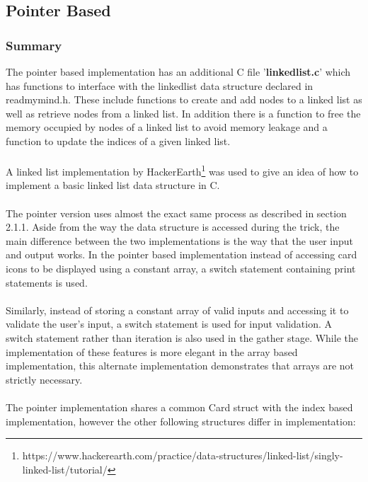 \documentclass[11]{article}
\begin{document}
		\subsection{Pointer Based}
			\subsubsection{Summary}
			The pointer based implementation has an additional C file '\textbf{linkedlist.c}' which has functions to interface with the linkedlist data structure declared in readmymind.h. These include functions to create and add nodes to a linked list as well as retrieve nodes from a linked list. In addition there is a function to free the memory occupied by nodes of a linked list to avoid memory leakage and a function to update the indices of a given linked list. \\\\A linked list implementation by HackerEarth\footnote{https://www.hackerearth.com/practice/data-structures/linked-list/singly-linked-list/tutorial/} was used to give an idea of how to implement a basic linked list data structure in C. \\\\ The pointer version uses almost the exact same process as described in section 2.1.1. Aside from the way the data structure is accessed during the trick, the main difference between the two implementations is the way that the user input and output works. In the pointer based implementation instead of accessing card icons to be displayed using a constant array, a switch statement containing print statements is used. \\\\Similarly, instead of storing a constant array of valid inputs and accessing it to validate the user's input, a switch statement is used for input validation. A switch statement rather than iteration is also used in the gather stage. While the implementation of these features is more elegant in the array based implementation, this alternate implementation demonstrates that arrays are not strictly necessary.
			\\\\The pointer implementation shares a common Card struct with the index based implementation, however the other following structures differ in implementation:
\end{document}
